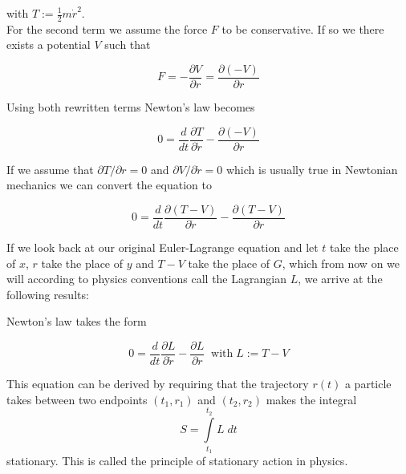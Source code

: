 \documentclass{article}
\begin{document}
with $T:=\frac{1}{2} m \dot{r}^2$. \\

For the second term we assume the force $F$ to be conservative. If so we there exists a potential $V$ such that 

\begin{equation}
F = - \frac{\partial V}{\partial r} = \frac{\partial (-V)}{\partial r}
\end{equation}

Using both rewritten terms Newton's law becomes


\begin{equation}
0 = \frac{d}{dt} \frac{\partial T}{\partial \dot{r}} - \frac{\partial (-V)}{\partial r}
\end{equation}



If we assume that $\partial T/ \partial r = 0$ and $\partial V / \partial \dot{r} = 0$ which is usually true in Newtonian mechanics we can convert the equation to 


\begin{equation}
0 = \frac{d}{dt} \frac{\partial (T-V)}{\partial \dot{r}} - \frac{\partial (T-V)}{\partial r}
\end{equation}

If we look back at our original Euler-Lagrange equation and let $t$ take the place of $x$, $r$ take the place of $y$ and $T-V$ take the place of $G$, which from now on we will according to physics conventions call the Lagrangian $L$, we arrive at the following results:

Newton's law takes the form

\begin{equation}
0 = \frac{d}{dt} \frac{\partial L}{\partial \dot{r}} - \frac{\partial L}{\partial r} \; \; \mbox{with} \; L := T-V
\end{equation}

This equation can be derived by requiring that the trajectory $r(t)$ a particle takes between two endpoints $(t_1,r_1)$ and $(t_2,r_2)$ makes the integral 
\begin{equation}
S=\int\limits_{t_1}^{t_2} L \; dt
\end{equation}
stationary. This is called the principle of stationary action in physics. \\
\end{document}
